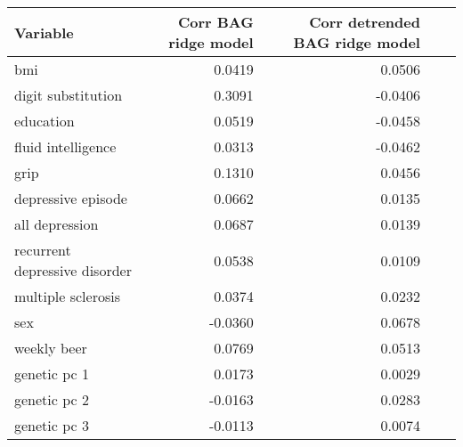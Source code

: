 \begin{tabular}{lrrrr}
\toprule
                     Variable &  Corr BAG ridge model &  Corr detrended BAG ridge model \\
\midrule
                          bmi &                0.0419 &                          0.0506 \\
           digit substitution &                0.3091 &                         -0.0406 \\
                    education &                0.0519 &                         -0.0458 \\
           fluid intelligence &                0.0313 &                         -0.0462 \\
                         grip &                0.1310 &                          0.0456 \\
           depressive episode &                0.0662 &                          0.0135 \\
               all depression &                0.0687 &                          0.0139 \\
recurrent depressive disorder &                0.0538 &                          0.0109 \\
           multiple sclerosis &                0.0374 &                          0.0232 \\
                          sex &               -0.0360 &                          0.0678 \\
                  weekly beer &                0.0769 &                          0.0513 \\
                 genetic pc 1 &                0.0173 &                          0.0029 \\
                 genetic pc 2 &               -0.0163 &                          0.0283 \\
                 genetic pc 3 &               -0.0113 &                          0.0074 \\
\bottomrule
\end{tabular}
